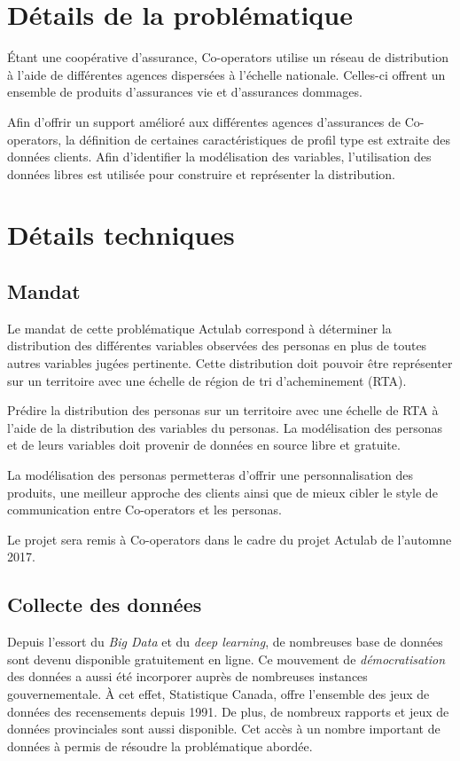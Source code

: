 \documentclass[11pt,french]{report}\usepackage[]{graphicx}\usepackage[]{color}
\begin{document}
\section*{Détails de la problématique}
Étant une coopérative d'assurance, Co-operators utilise un réseau de distribution à l'aide de différentes agences dispersées à l'échelle nationale. Celles-ci offrent un ensemble  de produits d'assurances vie et d'assurances dommages.
\newline

Afin d'offrir un support amélioré aux différentes agences d'assurances de Co-operators, la définition de certaines caractéristiques de profil type est extraite des données clients.  Afin d'identifier la modélisation des variables, l'utilisation des données libres est utilisée pour construire et représenter la distribution. 

\section*{Détails techniques}
\subsection*{Mandat}

Le mandat de cette problématique Actulab correspond à déterminer la distribution des différentes variables observées des personas en plus de toutes autres variables jugées pertinente. Cette distribution doit pouvoir être représenter sur un territoire avec une échelle de région de tri d'acheminement (RTA).
\newline

Prédire la distribution des personas sur un territoire avec une échelle de RTA à l'aide de la distribution des variables du personas. La modélisation des personas et de leurs variables doit provenir de données en source libre et gratuite. 
\newline

La modélisation des personas permetteras d'offrir une personnalisation des produits, une meilleur approche des clients ainsi que de mieux cibler le style de communication entre Co-operators et les personas.
\newline

Le projet sera remis à Co-operators dans le cadre du projet Actulab de l'automne 2017.

\subsection*{Collecte des données}
Depuis l'essort du \emph{Big Data} et du \emph{deep learning}, de nombreuses base de données sont devenu disponible gratuitement en ligne. Ce mouvement de \emph{démocratisation} des données a aussi été incorporer auprès de nombreuses instances gouvernementale. À cet effet, Statistique Canada, offre l'ensemble des jeux de données des recensements depuis 1991. De plus, de nombreux rapports et jeux de données provinciales sont aussi disponible. Cet accès à un nombre important de données à permis de résoudre la problématique abordée.
\newline
\end{document}
